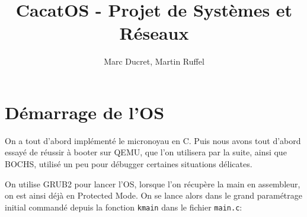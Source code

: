 \documentclass[a4paper,10pt, french]{article}
\title{CacatOS - Projet de Systèmes et Réseaux}
\author{Marc Ducret, Martin Ruffel}
\newcommand{\code}[1]{\texttt{#1}}
\begin{document}
\maketitle
\section{Démarrage de l'OS}

On a tout d'abord implémenté le micronoyau en C.
Puis nous avons tout d'abord essayé de réussir à booter sur QEMU, que l'on utilisera
par la suite, ainsi que BOCHS, utilisé un peu pour débugger certaines situations délicates.

On utilise GRUB2 pour lancer l'OS, lorsque l'on récupère la main en assembleur, on est ainsi déjà en 
Protected Mode. On se lance alors dans le grand paramétrage initial commandé depuis la fonction \code{kmain}
dans le fichier \code{main.c}:
\end{document}

